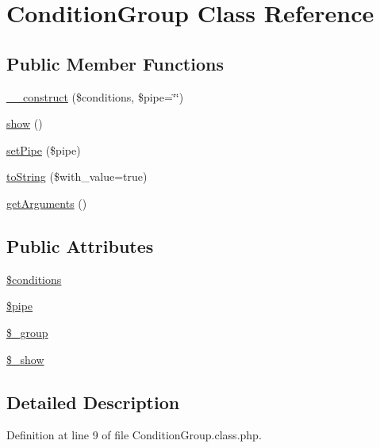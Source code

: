 \hypertarget{classConditionGroup}{\section{Condition\-Group Class Reference}
\label{classConditionGroup}
}
\subsection*{Public Member Functions}
\begin{DoxyCompactItemize}
\item 
\hyperlink{classConditionGroup_ac803cfcdc5a64e94031f8bb8da20bff3}{\-\_\-\-\_\-construct} (\$conditions, \$pipe=\char`\"{}\char`\"{})
\item 
\hyperlink{classConditionGroup_a1c58d26f63d47b3a7b6a221f7dc31fc5}{show} ()
\item 
\hyperlink{classConditionGroup_aa87eb83d1a7546a3db1cf2faf09a8960}{set\-Pipe} (\$pipe)
\item 
\hyperlink{classConditionGroup_a2c5a734221f4f169a394303a0ac446b1}{to\-String} (\$with\-\_\-value=true)
\item 
\hyperlink{classConditionGroup_accab5419d4cd79102efe65e4029ecfa4}{get\-Arguments} ()
\end{DoxyCompactItemize}
\subsection*{Public Attributes}
\begin{DoxyCompactItemize}
\item 
\hyperlink{classConditionGroup_a9ae5d5c5a416e2bd3724b95131572e98}{\$conditions}
\item 
\hyperlink{classConditionGroup_a18218f95ffd8355c699866a16b033c2f}{\$pipe}
\item 
\hyperlink{classConditionGroup_aabbbe42338beced430beec91b7971d18}{\$\-\_\-group}
\item 
\hyperlink{classConditionGroup_a914c0327f4fb26aebc7b8037fe3234a0}{\$\-\_\-show}
\end{DoxyCompactItemize}


\subsection{Detailed Description}


Definition at line 9 of file Condition\-Group.\-class.\-php.



